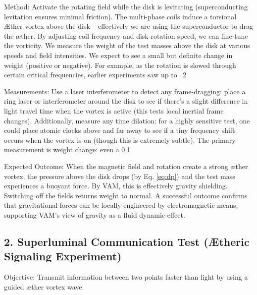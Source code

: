 Method: Activate the rotating field while the disk is levitating (superconducting levitation ensures minimal friction). The multi-phase coils induce a torsional Æther vortex above the disk – effectively we are using the superconductor to drag the æther. By adjusting coil frequency and disk rotation speed, we can fine-tune the vorticity. We measure the weight of the test masses above the disk at various speeds and field intensities. We expect to see a small but definite change in weight (positive or negative). For example, as the rotation is slowed through certain critical frequencies, earlier experiments saw up to ~2%


Measurements: Use a laser interferometer to detect any frame-dragging: place a ring laser or interferometer around the disk to see if there's a slight difference in light travel time when the vortex is active (this tests local inertial frame changes). Additionally, measure any time dilation: for a highly sensitive test, one could place atomic clocks above and far away to see if a tiny frequency shift occurs when the vortex is on (though this is extremely subtle). The primary measurement is weight change: even a 0.1%


Expected Outcome: When the magnetic field and rotation create a strong æther vortex, the pressure above the disk drops (by Eq. \eqref{eq:dp}) and the test mass experiences a buoyant force. By VAM, this is effectively gravity shielding. Switching off the fields returns weight to normal. A successful outcome confirms that gravitational forces can be locally engineered by electromagnetic means, supporting VAM’s view of gravity as a fluid dynamic effect.


\subsection*{2. Superluminal Communication Test (Ætheric Signaling Experiment)}

Objective: Transmit information between two points faster than light by using a guided æther vortex wave.


